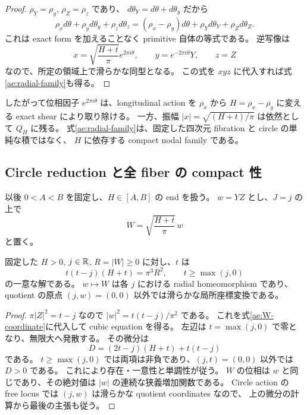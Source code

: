 \begin{proof}
$\rho_Y=\rho_y$, $\rho_Z=\rho_z$ であり、
$d\theta_Y=d\theta+d\theta_y$ だから
\[
 \rho_xd\theta+\rho_yd\theta_y+\rho_zd\theta_z
 =(\rho_x-\rho_y)d\theta+\rho_Yd\theta_Y+\rho_Zd\theta_Z.
\]
これは exact form を加えることなく primitive 自体の等式である。
逆写像は
\[
 x=\sqrt{\frac{H+t}{\pi}}e^{2\pi i\theta},\qquad
 y=e^{-2\pi i\theta}Y,\qquad z=Z
\]
なので、所定の領域上で滑らかな同型となる。
この式を $xyz$ に代入すれば式\eqref{ae:radial-family}も得る。
\end{proof}

したがって位相因子 $e^{2\pi i\theta}$ は、longitudinal action を
$\rho_x$ から $H=\rho_x-\rho_y$ に変える exact shear により取り除ける。
一方、振幅 $|x|=\sqrt{(H+t)/\pi}$ は依然として $Q_H$ に残る。
式\eqref{ae:radial-family}は、固定した四次元 fibration と circle の単純な積ではなく、
$H$ に依存する compact nodal family である。

\subsection{Circle reduction と全 fiber の compact 性}

以後 $0<A<B$ を固定し、$H\in[A,B]$ の end を扱う。
$w=YZ$ とし、$J=j$ の上で
\begin{equation}\label{ae:W-coordinate}
 W=\sqrt{\frac{H+t}{\pi}}\,w
\end{equation}
と置く。

\begin{lemma}\label{ae:cubic}
固定した $H>0$, $j\in\mathbb R$, $R=|W|\ge0$ に対し、$t$ は
\begin{equation}\label{ae:cubic-equation}
 t(t-j)(H+t)=\pi^3R^2,\qquad t\ge\max(j,0)
\end{equation}
の一意な解である。
$w\mapsto W$ は各 $j$ における radial homeomorphism であり、
quotient の原点 $(j,w)=(0,0)$ 以外では滑らかな局所座標変換である。
\end{lemma}

\begin{proof}
$\pi|Z|^2=t-j$ なので
$|w|^2=t(t-j)/\pi^2$ である。
これを式\eqref{ae:W-coordinate}に代入して cubic equation を得る。
左辺は $t=\max(j,0)$ で零となり、無限大へ発散する。
その微分は
\begin{equation}\label{ae:D}
 D=(2t-j)(H+t)+t(t-j)
\end{equation}
である。
$t\ge\max(j,0)$ では両項は非負であり、$(j,t)=(0,0)$ 以外では $D>0$ である。
これにより存在・一意性と単調性が従う。
$W$ の位相は $w$ と同じであり、その絶対値は $|w|$ の連続な狭義増加関数である。
Circle action の free locus では $(j,w)$ は滑らかな quotient coordinates なので、
上の微分の計算から最後の主張も従う。
\end{proof}

